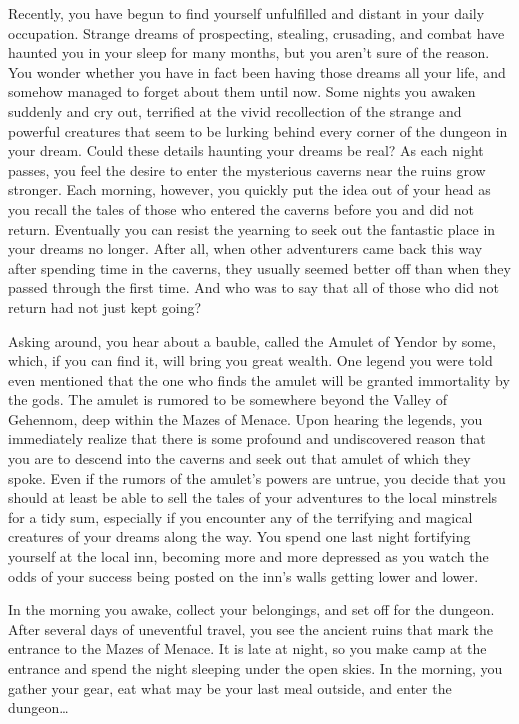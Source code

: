 Recently, you have begun to find yourself unfulfilled and distant
in your daily occupation.  Strange dreams of prospecting, stealing,
crusading, and combat have haunted you in your sleep for many months,
but you aren't sure of the reason.  You wonder whether you have in
fact been having those dreams all your life, and somehow managed to
forget about them until now.  Some nights you awaken suddenly
and cry out, terrified at the vivid recollection of the strange and
powerful creatures that seem to be lurking behind every corner of the
dungeon in your dream.  Could these details haunting your dreams be real?
As each night passes, you feel the desire to enter the mysterious caverns
near the ruins grow stronger.  Each morning, however, you quickly put
the idea out of your head as you recall the tales of those who entered
the caverns before you and did not return.  Eventually you can resist
the yearning to seek out the fantastic place in your dreams no longer.
After all, when other adventurers came back this way after spending time
in the caverns, they usually seemed better off than when they passed
through the first time.  And who was to say that all of those who did
not return had not just kept going?

Asking around, you hear about a bauble, called the Amulet of Yendor by some,
which, if you can find it, will bring you great wealth.  One legend you were
told even mentioned that the one who finds the amulet will be granted
immortality by the gods.  The amulet is rumored to be somewhere beyond the
Valley of Gehennom, deep within the Mazes of Menace.  Upon hearing the
legends, you immediately realize that there is some profound and
undiscovered reason that you are to descend into the caverns and seek
out that amulet of which they spoke.  Even if the rumors of the amulet's
powers are untrue, you decide that you should at least be able to sell the
tales of your adventures to the local minstrels for a tidy sum, especially
if you encounter any of the terrifying and magical creatures of
your dreams along the way.  You spend one last night fortifying yourself
at the local inn, becoming more and more depressed as you watch the odds
of your success being posted on the inn's walls getting lower and lower.

\nd In the morning you awake, collect your belongings, and
set off for the dungeon.  After several days of uneventful
travel, you see the ancient ruins that mark the entrance to the
Mazes of Menace.  It is late at night, so you make camp at the entrance
and spend the night sleeping under the open skies.  In the morning, you
gather your gear, eat what may be your last meal outside, and enter the
dungeon\ldots

